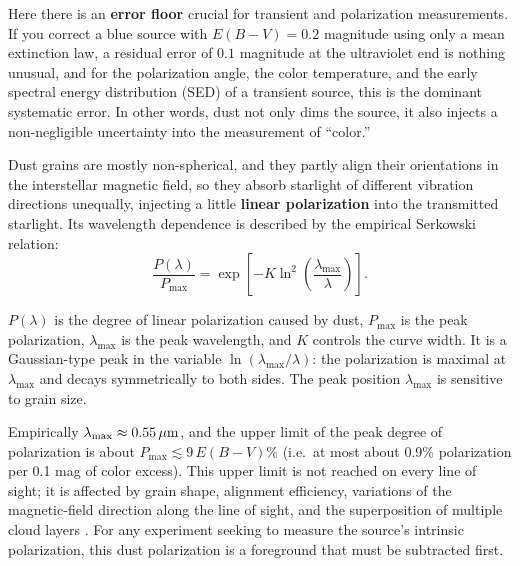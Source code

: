 Here there is an \textbf{error floor} crucial for transient and polarization measurements. If you correct a blue source with \(E(B-V)=0.2\) magnitude using only a mean extinction law, a residual error of \(0.1\) magnitude at the ultraviolet end is nothing unusual, and for the polarization angle, the color temperature, and the early spectral energy distribution (SED) of a transient source, this is the dominant systematic error. In other words, dust not only dims the source, it also injects a non-negligible uncertainty into the measurement of ``color.''

Dust grains are mostly non-spherical, and they partly align their orientations in the interstellar magnetic field, so they absorb starlight of different vibration directions unequally, injecting a little \textbf{linear polarization} into the transmitted starlight. Its wavelength dependence is described by the empirical Serkowski relation:
\begin{equation}
  \frac{P(\lambda)}{P_{\max}}
  =
  \exp\!\left[-K\ln^2\!\left(\frac{\lambda_{\max}}{\lambda}\right)\right].
  \label{eq:e21-serkowski}
\end{equation}
\begin{formulaexplain}
\(P(\lambda)\) is the degree of linear polarization caused by dust, \(P_{\max}\) is the peak polarization, \(\lambda_{\max}\) is the peak wavelength, and \(K\) controls the curve width. It is a Gaussian-type peak in the variable \(\ln(\lambda_{\max}/\lambda)\): the polarization is maximal at \(\lambda_{\max}\) and decays symmetrically to both sides. The peak position \(\lambda_{\max}\) is sensitive to grain size.
\end{formulaexplain}
Empirically \(\lambda_{\max}\approx0.55\,\mu{\rm m}\), and the upper limit of the peak degree of polarization is about \(P_{\max}\lesssim9\,E(B-V)\%\) (i.e.\ at most about 0.9\% polarization per 0.1 mag of color excess). This upper limit is not reached on every line of sight; it is affected by grain shape, alignment efficiency, variations of the magnetic-field direction along the line of sight, and the superposition of multiple cloud layers \citep{1975ApJ...196..261S,2015ARA&A..53..501A}. For any experiment seeking to measure the source's intrinsic polarization, this dust polarization is a foreground that must be subtracted first.

